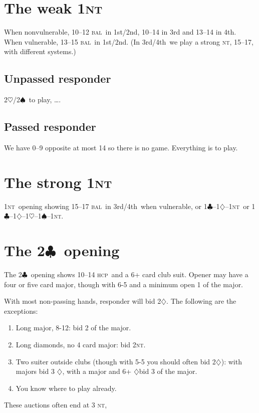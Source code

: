 \documentclass{report}
\newcommand{\fs}{1st/2nd}
\newcommand{\tf}{3rd/4th}
\newcommand{\hcp}{\textsc{hcp}}
\newcommand{\bal}{\textsc{bal}}
\renewcommand{\c}{\ensuremath{\clubsuit}}
\renewcommand{\d}{\ensuremath{\diamondsuit}}
\newcommand{\h}{\ensuremath{\heartsuit}}
\newcommand{\s}{\ensuremath{\spadesuit}}
\newcommand{\nt}{\textsc{nt}}
\newcommand{\+}{\ensuremath{^+}}
\begin{document}
\chapter{The weak 1\nt}

When nonvulnerable, 10--12 \bal\ in \fs, 10--14 in 3rd and 13--14 in
4th.  When vulnerable, 13--15 \bal\ in \fs.  (In \tf\ we play a strong
\nt, 15--17, with different systems.)

\section{Unpassed responder}
2\h/2\s\ to play, \dots.

\section{Passed responder}
We have 0--9 opposite at most 14 so there is no game.  Everything is
to play.

\chapter{The strong 1\nt}
1\nt\ opening showing 15--17 \bal\ in \tf\ when vulnerable, or
1\c--1\d--1\nt\ or 1\c--1\d--1\h--1\s--1\nt.

\chapter{The 2\c\ opening}

The 2\c\ opening shows 10--14 \hcp\ and a 6+ card club suit.  Opener may have a four or five card major, though with 6-5 and a minimum open 1 of the major.

With most non-passing hands, responder will bid 2\d.  The following are the exceptions:
\begin{enumerate}
\item Long major, 8-12: bid 2 of the major.
\item Long diamonds, no 4 card major: bid 2\nt.
\item Two suiter outside clubs (though with 5-5 you should often bid 2\d): with majors bid 3 \d, with a major and 6+ \d bid 3 of the major.
\item You know where to play already.
\end{enumerate}

These auctions often end at 3 \nt, 
\end{document}
